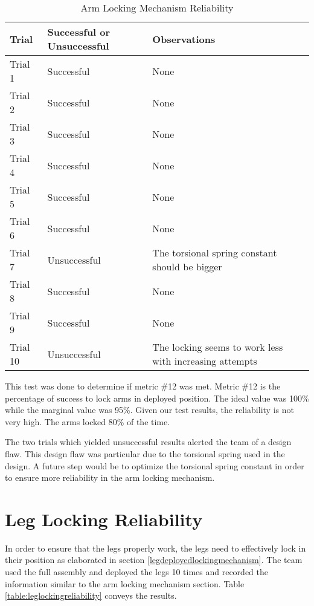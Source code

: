 \begin{table}[H]
\centering
\caption{Arm Locking Mechanism Reliability}
\label{table:armlockingreliability}
\begin{tabular}{|
>{\raggedright\arraybackslash}p{}|
>{\raggedright\arraybackslash}p{}|
>{\raggedright\arraybackslash}p{}|
}
    \hline
     \textbf{Trial} & \textbf{Successful or Unsuccessful } & \textbf{Observations}
    \\\hline 
     Trial 1 & Successful & {None}
     \\\hline 
     Trial 2 & Successful & {None}
     \\\hline
     Trial 3 & Successful & {None}
     \\\hline
    Trial 4 & Successful & {None}
     \\\hline
    Trial 5 & Successful & {None}
    \\\hline
    Trial 6 & Successful & {None}
    \\\hline
    Trial 7 & Unsuccessful & {The torsional spring constant should be bigger }
    \\\hline
    Trial 8 & Successful & {None}
    \\\hline
    Trial 9 & Successful & {None}
    \\\hline
    Trial 10 & Unsuccessful & {The locking seems to work less with increasing attempts}
    \\\hline
\end{tabular}
\end{table}

This test was done to determine if metric \#12 was met. Metric \#12 is the percentage of success to lock arms in deployed position. The ideal value was 100\% while the marginal value was 95\%. Given our test results, the reliability is not very high. The arms locked 80\% of the time. 

The two trials which yielded unsuccessful results alerted the team of a design flaw. This design flaw was particular due to the torsional spring used in the design. A future step would be to optimize the torsional spring constant in order to ensure more reliability in the arm locking mechanism.

\section{Leg Locking Reliability}
In order to ensure that the legs properly work, the legs need to effectively lock in their position as elaborated in section \ref{legdeployedlockingmechanism}. The team used the full assembly and deployed the legs 10 times and recorded the information similar to the arm locking mechanism section. Table \ref{table:leglockingreliability} conveys the results.

